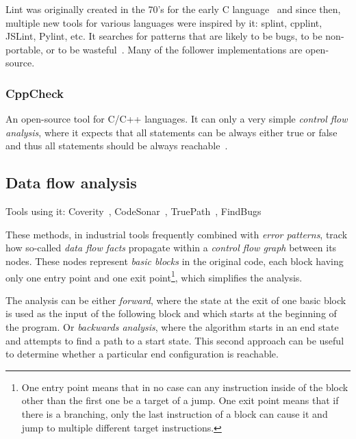 Lint was originally created in the 70's for the early C language~\cite[Chap. 2.2]{KrenaVojnarOverview} and since then, multiple new tools for various languages were inspired by it: splint, cpplint, JSLint, Pylint, etc. It searches for patterns that are likely to be bugs, to be non-portable, or to be wasteful~\cite{lintMan}. Many of the follower implementations are open-source.

\subsubsection{CppCheck}

An open-source tool for C/C++ languages. It can only a very simple {\em control flow analysis}, where it expects that all statements can be always either true or false and thus all statements should be always reachable~\cite{cppcheckDesign}.

\subsection{Data flow analysis}

Tools using it: Coverity~\cite{KrenaVojnarOverview}, CodeSonar~\cite{KrenaVojnarOverview}, TruePath~\cite{KrenaVojnarOverview}, FindBugs~\cite{KrenaVojnarOverview}

These methods, in industrial tools frequently combined with {\em error patterns}, track how so-called {\em data flow facts} propagate within a {\em control flow graph} between its nodes. These nodes represent {\em basic blocks} in the original code, each block having only one entry point and one exit point\footnote{One entry point means that in no case can any instruction inside of the block other than the first one be a target of a jump. One exit point means that if there is a branching, only the last instruction of a block can cause it and jump to multiple different target instructions.}, which simplifies the analysis.

The analysis can be either {\em forward}, where the state at the exit of one basic block is used as the input of the following block and which starts at the beginning of the program. Or {\em backwards analysis}, where the algorithm starts in an end state and attempts to find a path to a start state. This second approach can be useful to determine whether a particular end configuration is reachable.

